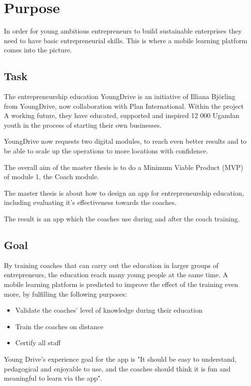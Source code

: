 \section{Purpose}

In order for young ambitious entrepreneurs to build sustainable enterprises they need to have basic entrepreneurial skills. This is where a mobile learning platform comes into the picture.

\subsection{Task}
The entrepreneurship education YoungDrive is an initiative of Illiana Björling from YoungDrive, now collaboration with Plan International. Within the project A working future, they have educated, supported and inspired 12 000 Ugandan youth in the process of starting their own businesses. \cite{nissar-linkedin}

YoungDrive now requests two digital modules, to reach even better results and to be able to scale up the operations to more locations with confidence.

The overall aim of the master thesis is to do a Minimum Viable Product (MVP) of module 1, the Coach module.

The master thesis is about how to design an app for entrepreneurship education, including evaluating it's effectiveness towards the coaches.

The result is an app which the coaches use during and after the coach training.

\subsection{Goal}

By training coaches that can carry out the education in larger groups of entrepreneurs, the education reach many young people at the same time. A mobile learning platform is predicted to improve the effect of the training even more, by fulfilling the following purposes:

\begin{itemize}
  \item Validate the coaches' level of knowledge during their education
    \item Train the coaches on distance
    \item Certify all staff
\end{itemize}

Young Drive's experience goal for the app is "It should be easy to understand, pedagogical and enjoyable to use, and the coaches should think it is fun and meaningful to learn via the app". \cite{youngdrive-masterthesis-idea}
